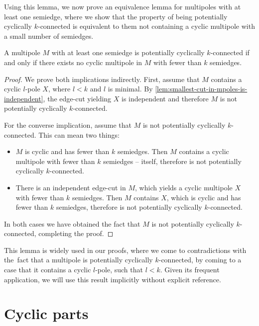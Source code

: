 \documentclass[12pt, twoside]{book}
\begin{document}
Using this lemma, we now prove an equivalence lemma for multipoles with at least one semiedge, where we show that the property of being potentially cyclically \mbox{$k$-connected} is equivalent to them not containing a cyclic multipole with a small number of semiedges.

\begin{lemma}
	A multipole $M$ with at least one semiedge is potentially cyclically $k$-connected if and only if there exists no cyclic multipole in $M$ with fewer than $k$ semiedges.
\end{lemma}

\begin{proof}
	We prove both implications indirectly. First, assume that $M$ contains a cyclic \mbox{$l$-pole} $X$, where $l<k$ and $l$ is minimal. By \cref{lem:smallest-cut-in-mpoles-is-independent}, the edge-cut yielding $X$ is independent and therefore $M$ is not potentially cyclically $k$-connected.
	
	For the converse implication, assume that $M$ is not potentially cyclically $k$-connected. This can mean two things:
	\begin{itemize}
		\item $M$ is cyclic and has fewer than $k$ semiedges. Then $M$ contains a cyclic multipole with fewer than $k$ semiedges -- itself, therefore is not potentially cyclically \mbox{$k$-connected}.
		\item There is an independent edge-cut in $M$, which yields a cyclic multipole $X$ with fewer than $k$ semiedges. Then $M$ contains $X$, which is cyclic and has fewer than $k$ semiedges, therefore is not potentially cyclically $k$-connected.
	\end{itemize}
	
	In both cases we have obtained the fact that $M$ is not potentially cyclically \mbox{$k$-connected}, completing the proof.
\end{proof}

This lemma is widely used in our proofs, where we come to contradictions with the~fact that a multipole is potentially cyclically $k$-connected, by coming to a case that it contains a cyclic $l$-pole, such that $l<k$. Given its frequent application, we will use this result implicitly without explicit reference.

\section{Cyclic parts}\label{sec:cyclic-part-results}
\end{document}
